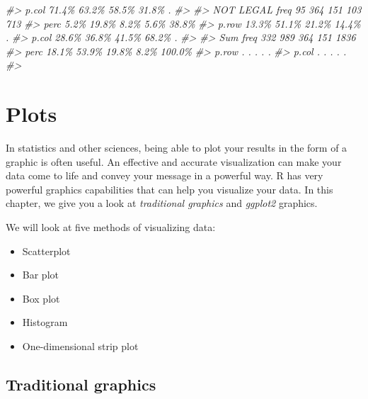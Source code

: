 \documentclass[
]{book}
\newenvironment{Shaded}{\begin{snugshade}}{\end{snugshade}}
\newcommand{\CommentTok}[1]{\textcolor[rgb]{0.56,0.35,0.01}{\textit{#1}}}
\providecommand{\tightlist}{%
  \setlength{\itemsep}{0pt}\setlength{\parskip}{0pt}}
\begin{document}
\begin{Shaded}
\begin{Highlighting}[]
\CommentTok{\#\textgreater{}             p.col  71.4\%   63.2\%   58.5\%  31.8\%      .}
\CommentTok{\#\textgreater{}                                                       }
\CommentTok{\#\textgreater{} NOT LEGAL   freq      95     364     151    103    713}
\CommentTok{\#\textgreater{}             perc    5.2\%   19.8\%    8.2\%   5.6\%  38.8\%}
\CommentTok{\#\textgreater{}             p.row  13.3\%   51.1\%   21.2\%  14.4\%      .}
\CommentTok{\#\textgreater{}             p.col  28.6\%   36.8\%   41.5\%  68.2\%      .}
\CommentTok{\#\textgreater{}                                                       }
\CommentTok{\#\textgreater{} Sum         freq     332     989     364    151  1\textquotesingle{}836}
\CommentTok{\#\textgreater{}             perc   18.1\%   53.9\%   19.8\%   8.2\% 100.0\%}
\CommentTok{\#\textgreater{}             p.row      .       .       .      .      .}
\CommentTok{\#\textgreater{}             p.col      .       .       .      .      .}
\CommentTok{\#\textgreater{} }
\end{Highlighting}
\end{Shaded}

\hypertarget{plots}{%
\section{Plots}\label{plots}}

In statistics and other sciences, being able to plot your results in the form
of a graphic is often useful. An effective and accurate visualization can
make your data come to life and convey your message in a powerful way.
R has very powerful graphics capabilities that can help you visualize your
data. In this chapter, we give you a look at \emph{traditional graphics} and \emph{ggplot2} graphics.

We will look at five methods of visualizing data:

\begin{itemize}
\tightlist
\item
  Scatterplot
\item
  Bar plot
\item
  Box plot
\item
  Histogram
\item
  One-dimensional strip plot
\end{itemize}

\hypertarget{traditional-graphics}{%
\subsection{Traditional graphics}\label{traditional-graphics}}
\end{document}
